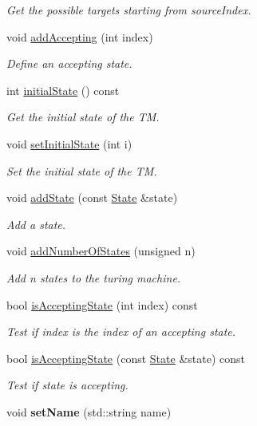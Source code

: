 \begin{DoxyCompactItemize}
\begin{DoxyCompactList}\small\item\em \-Get the possible targets starting from {\ttfamily source\-Index}. \end{DoxyCompactList}\item 
void \hyperlink{classtum_1_1_turing_machine_ae478d79050408f969a5a254fe2959d25}{add\-Accepting} (int index)
\begin{DoxyCompactList}\small\item\em \-Define an accepting state. \end{DoxyCompactList}\item 
int \hyperlink{classtum_1_1_turing_machine_ab3a8de20abdb1a809cea7bc56341fd40}{initial\-State} () const 
\begin{DoxyCompactList}\small\item\em \-Get the initial state of the \-T\-M. \end{DoxyCompactList}\item 
void \hyperlink{classtum_1_1_turing_machine_a8914f51119b3ed7b6610334a8ce281d4}{set\-Initial\-State} (int i)
\begin{DoxyCompactList}\small\item\em \-Set the initial state of the \-T\-M. \end{DoxyCompactList}\item 
void \hyperlink{classtum_1_1_turing_machine_ac4f542df082b25183324817db89958c6}{add\-State} (const \hyperlink{classtum_1_1_state}{\-State} \&state)
\begin{DoxyCompactList}\small\item\em \-Add a state. \end{DoxyCompactList}\item 
void \hyperlink{classtum_1_1_turing_machine_a57c96887f4c0e9216fa15919da71ee13}{add\-Number\-Of\-States} (unsigned n)
\begin{DoxyCompactList}\small\item\em \-Add {\ttfamily n} states to the turing machine. \end{DoxyCompactList}\item 
bool \hyperlink{classtum_1_1_turing_machine_a534d1ff2e7510b34b793d6748e0a36fa}{is\-Accepting\-State} (int index) const 
\begin{DoxyCompactList}\small\item\em \-Test if {\ttfamily index} is the index of an accepting state. \end{DoxyCompactList}\item 
bool \hyperlink{classtum_1_1_turing_machine_aa4f0c55c1ec6ca39a0d635f711eb27b7}{is\-Accepting\-State} (const \hyperlink{classtum_1_1_state}{\-State} \&state) const 
\begin{DoxyCompactList}\small\item\em \-Test if {\ttfamily state} is accepting. \end{DoxyCompactList}\item 
\hypertarget{classtum_1_1_turing_machine_a89627e1138b16e4eab5ed3f6b338e0bb}{void {\bfseries set\-Name} (std\-::string name)}\label{classtum_1_1_turing_machine_a89627e1138b16e4eab5ed3f6b338e0bb}


\end{DoxyCompactItemize}
